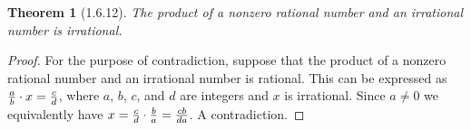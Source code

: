 \documentclass[a4paper, 12pt]{article}
\theoremstyle{plain}
\newtheorem*{theorem*}{Theorem}
\begin{document}
	
	\begin{theorem*}[1.6.12]
		The product of a nonzero rational number and an irrational number is irrational.
	\end{theorem*}
	
	\begin{proof}
		For the purpose of contradiction, suppose that the product of a nonzero rational number and an irrational number is rational. This can be expressed as $\frac{a}{b} \space \cdot \space x = \frac{c}{d}$, where $a$, $b$, $c$, and $d$ are integers and $x$ is irrational. Since $a \neq 0$ we equivalently have $x = \frac{c}{d} \space \cdot \space \frac{b}{a} = \frac{cb}{da}$. A contradiction.
	\end{proof}
\end{document}

